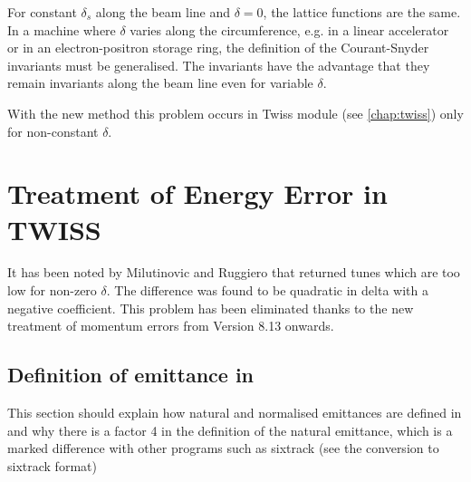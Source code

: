 For constant $\delta_s$ along the beam line and $\delta = 0$, the
lattice functions are the same. In a machine where $\delta$ varies along
the circumference, e.g. in a linear accelerator or in an
electron-positron storage ring, the definition of the Courant-Snyder
invariants must be generalised. The \madeight invariants have the advantage
that they remain invariants along the beam line even for variable $\delta$.  

With the new method this problem occurs in Twiss module (see
\ref{chap:twiss}) only for non-constant $\delta$.    

\section{Treatment of Energy Error in TWISS} 
\label{sec:twiss_energy_error}
It has been noted by Milutinovic and Ruggiero \cite{milutinovic1988}
that \madeight returned tunes which are too low for non-zero
$\delta$. The difference was found to be quadratic in delta with a negative
coefficient. This problem has been eliminated thanks to the new
treatment  of momentum errors from \madeight Version 8.13 onwards.   

\begin{5.02.04}
\section{Definition of emittance in \madx}
\label{sec:emittance_definition}
This section should explain how natural and normalised emittances are
defined in \madx and why there is a factor 4 in the definition of the
natural emittance, which is a marked difference with other programs such
as sixtrack (see the conversion to sixtrack format)

\end{5.02.04}


